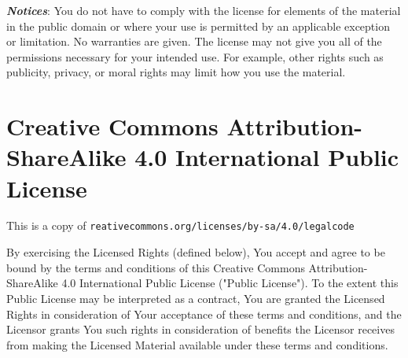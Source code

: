 \textbf{\textit{Notices}}:
You do not have to comply with the license for elements of the material in the public domain or where your use is permitted by an applicable exception or limitation.
No warranties are given. The license may not give you all of the permissions necessary for your intended use. For example, other rights such as publicity, privacy, or moral rights may limit how you use the material.

\section*{Creative Commons Attribution-ShareAlike 4.0 International Public License}
This is a copy of \texttt{reativecommons.org/licenses/by-sa/4.0/legalcode}

By exercising the Licensed Rights (defined below), You accept and agree to be bound by the terms and conditions of this Creative Commons Attribution-ShareAlike 4.0 International Public License ("Public License"). To the extent this Public License may be interpreted as a contract, You are granted the Licensed Rights in consideration of Your acceptance of these terms and conditions, and the Licensor grants You such rights in consideration of benefits the Licensor receives from making the Licensed Material available under these terms and conditions.

